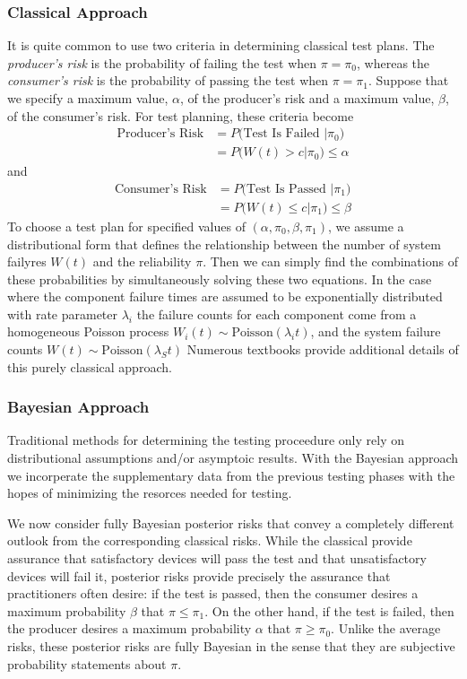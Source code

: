 \documentclass[12pt]{article}
\begin{document}
\subsubsection{Classical Approach}
It is quite common to use two criteria in determining classical test plans. The
\emph{producer's risk} is the probability of failing the test when $\pi =
\pi_0$, whereas the \emph{consumer's risk} is the probability of passing the
test when $\pi = \pi_1$.  Suppose that we specify a maximum value, $\alpha$, of
the producer's risk and a maximum value, $\beta$, of the consumer's risk. For
test planning, these criteria become
$$
\begin{aligned}
	\text{Producer's Risk} &= P \text{(Test Is Failed } \vert \pi_0 \text{)} \\
    &= P \text{(} W(t) > c \vert \pi_0 \text{)} \leq \alpha
\end{aligned}
$$
and
$$
\begin{aligned}
	\text{Consumer's Risk} &= P \text{(Test Is Passed } \vert \pi_1 \text{)} \\
    &= P \text{(} W(t) \leq c \vert \pi_1 \text{)} \leq \beta
\end{aligned}
$$
To choose a test plan for specified values of $(\alpha, \pi_0, \beta, \pi_1)$,
we assume a distributional form that defines the relationship between the number
of system failyres $W(t)$ and the reliability $\pi$.  Then we can simply find
the combinations of these probabilities by simultaneously solving these two
equations.  In the case where the component failure times are assumed to be
exponentially distributed with rate parameter $\lambda_i$ the failure counts for
each component come from a homogeneous Poisson process $W_i(t) \sim
\text{Poisson}(\lambda_i t)$, and the system failure counts $W(t) \sim
\text{Poisson}(\lambda_S t)$  Numerous textbooks provide additional details of
this purely classical approach.

\subsubsection{Bayesian Approach}
Traditional methods for determining the testing proceedure only rely on
distributional assumptions and/or asymptoic results. With the Bayesian approach
we incorperate the supplementary data from the previous testing phases with the
hopes of minimizing the resorces needed for testing.


We now consider fully Bayesian posterior risks that convey a completely
different outlook from the corresponding classical risks. While the classical
provide assurance that satisfactory devices will pass the test and that
unsatisfactory devices will fail it, posterior risks provide precisely the
assurance that practitioners often desire: if the test is passed, then the
consumer desires a maximum probability $\beta$ that $\pi \leq \pi_1$. On the
other hand, if the test is failed, then the producer desires a maximum
probability $\alpha$ that $\pi \geq \pi_0$. Unlike the average risks, these
posterior risks are fully Bayesian in the sense that they are subjective
probability statements about $\pi$.
\end{document}

